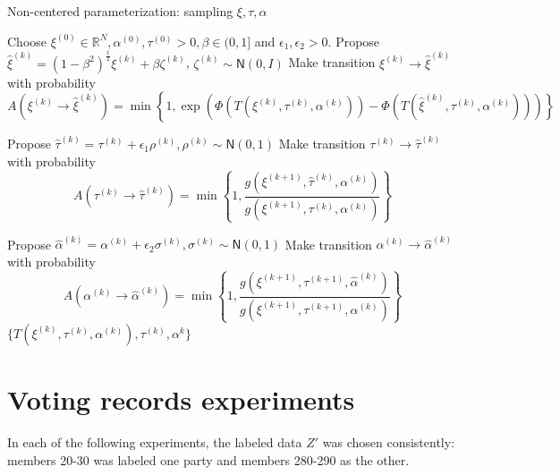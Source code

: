 \documentclass{siamart1116}
\begin{document}
\begin{algorithm}
\caption{Non-centered parameterization: sampling $\xi, \tau, \alpha$}
\label{alg:xi_tau_alpha}
\begin{algorithmic}
\State Choose $\xi^{(0)} \in \mathbb{R}^N, \alpha^{(0)}, \tau^{(0)} > 0, \beta \in (0, 1]$ and $\epsilon_1, \epsilon_2 > 0$.
\State Propose $\hat\xi^{(k)} = (1-\beta^2)^{\frac{1}{2}}\xi^{(k)} + \beta \zeta^{(k)}$, $\zeta^{(k)} \sim \mathsf{N}(0, I)$
\State Make transition $\xi^{(k)} \to \hat\xi^{(k)}$ with probability
\[ A(\xi^{(k)} \to \hat\xi^{(k)}) = \min\left\{1, \exp\left(\Phi(T(\xi^{(k)},\tau^{(k)},\alpha^{(k)})) - \Phi(T(\hat\xi^{(k)},\tau^{(k)},\alpha^{(k)}))\right) \right\}\] 

\State Propose $\hat\tau^{(k)} = \tau^{(k)} + \epsilon_1 \rho^{(k)}, \rho^{(k)} \sim \mathsf{N}(0,1)$
\State Make transition $\tau^{(k)} \to \hat\tau^{(k)}$ with probability
\[ A(\tau^{(k)} \to \hat\tau^{(k)}) = \min\left\{1, \frac{g(\xi^{(k+1)},\hat\tau^{(k)},\alpha^{(k)})}{g(\xi^{(k+1)},\tau^{(k)},\alpha^{(k)})} \right\}\] 

\State Propose $\hat\alpha^{(k)} = \alpha^{(k)} + \epsilon_2 \sigma^{(k)}, \sigma^{(k)} \sim \mathsf{N}(0,1)$
\State Make transition $\alpha^{(k)} \to \hat\alpha^{(k)}$ with probability
\[ A(\alpha^{(k)} \to \hat\alpha^{(k)}) = \min\left\{1, \frac{g(\xi^{(k+1)},\tau^{(k+1)},\hat \alpha^{(k)})}{g(\xi^{(k+1)},\tau^{(k+1)},\alpha^{(k)})} \right\}\]
\EndFor
\State \Return $\{ T(\xi^{(k)},\tau^{(k)},\alpha^{(k)}), \tau^{(k)}, \alpha^{k} \}$
\end{algorithmic}
\end{algorithm}



\section{Voting records experiments}
In each of the following experiments, the labeled data $Z'$ was chosen consistently: members 20-30 was labeled one party and members 280-290 as the other.
\end{document}

